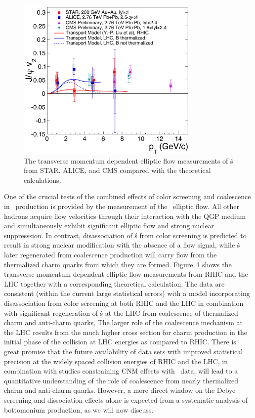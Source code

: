 \begin{figure}[!htb]
\centerline{
\includegraphics[width=0.8\textwidth]{fig/Jpsi_v2}
}
\caption[\Jpsi\ elliptic flow measurements at RHIC and LHC compared to theory]{
The transverse momentum dependent elliptic flow measurements of
\Jpsi\'s from STAR\cite{Adamczyk:2012pw}, ALICE\cite{ALICE:2013xna}, and CMS\cite{Moon:2014lia} compared with the theoretical calculations\cite{Liu:2009gx}.
}
\label{Fig:JPsi_v2}
\end{figure}

One of the crucial tests of the combined effects of color screening
and coalescence in \Jpsi\ production is provided by the measurement of the \Jpsi\ elliptic flow.
All other hadrons acquire flow velocities through their interaction with 
the QGP medium and simultaneously exhibit
significant elliptic flow and strong nuclear suppresssion. 
In contrast, disassociation of \Jpsi\'s from color screening
is predicted to result in strong nuclear modification with the absence of a flow signal, while
\Jpsi\'s later regenerated from coalescence production will carry flow from the thermalized charm quarks from which they are formed. 
Figure~\ref{Fig:JPsi_v2} 
shows the transverse momentum dependent elliptic flow measurements\cite{Adamczyk:2012pw,ALICE:2013xna,Moon:2014lia} 
from RHIC and the LHC together with a corresponding theoretical calculation\cite{Liu:2009gx}.
The data are consistent (within the current large statistical errors) with a model incorporating
disassociation from color screening at both RHIC and the LHC in combination with
significant regeneration of \Jpsi\'s at the LHC from coalescence of thermalized charm and anti-charm quarks,
The larger role of the coalescence  mechanism at the LHC results from the much 
higher cross section for charm production in the initial phase of the collision at LHC energies as compared to RHIC.
There is great promise that the  future availability of data sets 
with improved statistical precision
at the widely spaced collision energies of RHIC and the LHC, 
in combination with studies constraining CNM effects with \pA\ data, 
will lead to a quantitative
understanding of the role of coalescence from nearly thermalized charm and anti-charm quarks.
However, a more direct window on the Debye screening and dissociation effects alone is expected from
a systematic analysis of bottomonium production, as we will now discuss.
		

